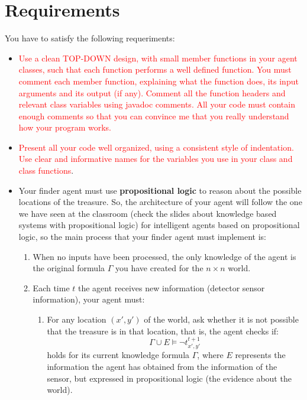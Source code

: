 \documentclass{tufte-handout}
\begin{document}
\section{Requirements}

\begin{fullwidth}
You have to satisfy the following requeriments:
\begin{itemize}
\item \textcolor{red}{Use a clean TOP-DOWN design, with small member functions in your
agent classes, such that each function performs a well defined function.
You must comment each member function, explaining what the function
does, its input arguments and its output (if any).
Comment all the function headers and relevant class variables using javadoc
comments.
All your code must contain enough comments so that you can convince
me that you really understand how your program works.}
\item \textcolor{red}{Present all your code well organized, using a consistent style of indentation. Use clear and informative names for the variables you use in your
class and class functions}.
\item Your finder agent must use {\bf propositional logic} to reason
 about the possible locations of the treasure. So, the architecture
of your agent will follow the one we have seen at the classroom
 (check the slides about knowledge based systems with propositional
logic) for intelligent agents based on propositional
logic, so the main process that your finder agent must   implement is:
\begin{enumerate}
\item When no inputs have been processed, the only knowledge of
the agent is the original formula $\Gamma$ you have created for
the $n\times n$ world.
\item Each time $t$ the agent receives new information (detector sensor information),  your agent must:
\begin{enumerate}
\item For any location $(x',y')$ of the world, ask whether
it is not possible that the treasure is in that location, that is,
the agent checks if:
$$ \Gamma \cup E \models \neg t_{x',y'}^{t+1}  $$
holds for its current knowledge formula $\Gamma$, where $E$ represents
the information the agent has obtained from the information of the sensor,
 but expressed in propositional logic (the evidence about the world).

\end{enumerate}
\end{enumerate}
\end{itemize}
\end{fullwidth}
\end{document}
